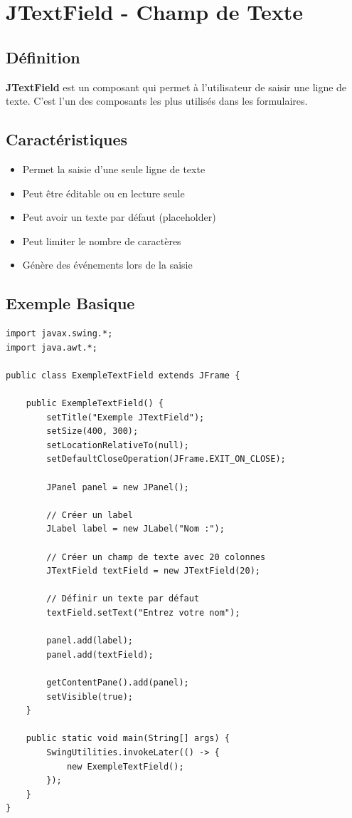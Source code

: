 \documentclass[11pt,a4paper]{article}
\begin{document}
\newpage

\section{JTextField - Champ de Texte}

\subsection{Définition}

\textbf{JTextField} est un composant qui permet à l'utilisateur de saisir une ligne de texte. C'est l'un des composants les plus utilisés dans les formulaires.

\subsection{Caractéristiques}

\begin{itemize}
    \item Permet la saisie d'une seule ligne de texte
    \item Peut être éditable ou en lecture seule
    \item Peut avoir un texte par défaut (placeholder)
    \item Peut limiter le nombre de caractères
    \item Génère des événements lors de la saisie
\end{itemize}

\subsection{Exemple Basique}

\begin{lstlisting}
import javax.swing.*;
import java.awt.*;

public class ExempleTextField extends JFrame {
    
    public ExempleTextField() {
        setTitle("Exemple JTextField");
        setSize(400, 300);
        setLocationRelativeTo(null);
        setDefaultCloseOperation(JFrame.EXIT_ON_CLOSE);
        
        JPanel panel = new JPanel();
        
        // Créer un label
        JLabel label = new JLabel("Nom :");
        
        // Créer un champ de texte avec 20 colonnes
        JTextField textField = new JTextField(20);
        
        // Définir un texte par défaut
        textField.setText("Entrez votre nom");
        
        panel.add(label);
        panel.add(textField);
        
        getContentPane().add(panel);
        setVisible(true);
    }
    
    public static void main(String[] args) {
        SwingUtilities.invokeLater(() -> {
            new ExempleTextField();
        });
    }
}
\end{lstlisting}
\end{document}
